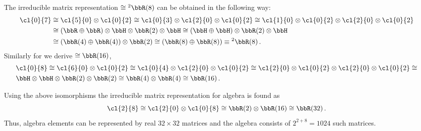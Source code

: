 %
\begin{example} The irreducible matrix representation $\cong
{^2\bbR(8)}$ can be obtained in the following way:
\[\begin{split}
\cl{0}{7}&\cong\cl{5}{0}\otimes\cl{0}{2}
\cong\cl{0}{3}\otimes\cl{2}{0}\otimes\cl{0}{2}
\cong\cl{1}{0}\otimes\cl{0}{2}\otimes\cl{2}{0}\otimes\cl{0}{2}\\
&\cong(\bbR\oplus\bbR)\otimes\bbH\otimes\bbR(2)\otimes\bbH
\cong(\bbH\oplus\bbH)\otimes\bbR(2)\otimes\bbH\\
&\cong(\bbR(4)\oplus\bbR(4))\otimes\bbR(2)
\cong(\bbR(8)\oplus\bbR(8))\equiv{^2\bbR(8)\,.}
\end{split}\]
Similarly for   we derive $\cong
{\bbR(16)}$,
\[\begin{split}
&\cl{0}{8}\cong\cl{6}{0}\otimes\cl{0}{2}\cong
\cl{0}{4}\otimes\cl{2}{0}\otimes\cl{0}{2}\cong
\cl{2}{0}\otimes\cl{0}{2}\otimes\cl{2}{0}\otimes\cl{0}{2}\cong\\
&\bbH\otimes\bbH\otimes\bbR(2)\otimes\bbR(2)\cong\bbR(4)\otimes\bbR(4)
\cong\bbR(16)\,.
\end{split}\]
\end{example}
%
\begin{example}
Using the above isomorphisms the irreducible matrix representation
for  algebra is found as
\[\cl{2}{8}\cong\cl{2}{0}\otimes\cl{0}{8}\cong\bbR(2)\otimes\bbR(16)\cong\bbR(32) \,.\]
Thus,  algebra elements can be represented by real
$32\times 32$ matrices and the algebra consists of  $2^{2+8}=1024$
such matrices.
\end{example}
%
